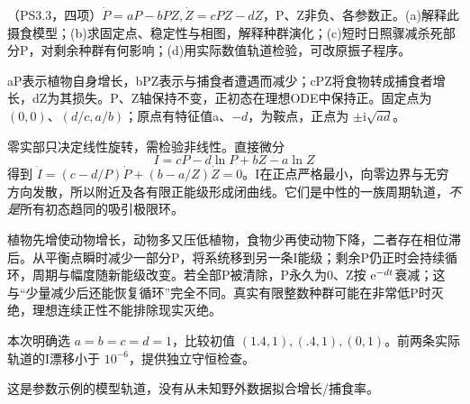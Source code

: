 \begin{exercise}\label{task:chaos-PS3-3}
（PS3.3，四项）$\dot P=aP-bPZ,\dot Z=cPZ-dZ$，P、Z非负、各参数正。(a)解释此摄食模型；(b)求固定点、稳定性与相图，解释种群演化；(c)短时日照骤减杀死部分P，对剩余种群有何影响；(d)用实际数值轨道检验，可改原振子程序。
\end{exercise}
\begin{solution}
aP表示植物自身增长，bPZ表示与捕食者遭遇而减少；cPZ将食物转成捕食者增长，dZ为其损失。P、Z轴保持不变，正初态在理想ODE中保持正。固定点为 $(0,0)$、$(d/c,a/b)$；原点有特征值a、$-d$，为鞍点，正点为 $\pm\mathrm i\sqrt{ad}$。

零实部只决定线性旋转，需检验非线性。直接微分
\[
 I=cP-d\ln P+bZ-a\ln Z
\]
得到 $\dot I=(c-d/P)\dot P+(b-a/Z)\dot Z=0$。I在正点严格最小，向零边界与无穷方向发散，所以附近及各有限正能级形成闭曲线。它们是中性的一族周期轨道，\emph{不是}所有初态趋同的吸引极限环。

植物先增使动物增长，动物多又压低植物，食物少再使动物下降，二者存在相位滞后。从平衡点瞬时减少一部分P，将系统移到另一条I能级；剩余P仍正时会持续循环，周期与幅度随新能级改变。若全部P被清除，P永久为0、Z按 $\mathrm e^{-dt}$衰减；这与“少量减少后还能恢复循环”完全不同。真实有限整数种群可能在非常低P时灭绝，理想连续正性不能排除现实灭绝。

本次明确选 $a=b=c=d=1$，比较初值 $(1.4,1),(.4,1),(0,1)$。前两条实际轨道的I漂移小于 $10^{-6}$，提供独立守恒检查。
\begin{center}\end{center}
这是参数示例的模型轨道，没有从未知野外数据拟合增长/捕食率。
\end{solution}

